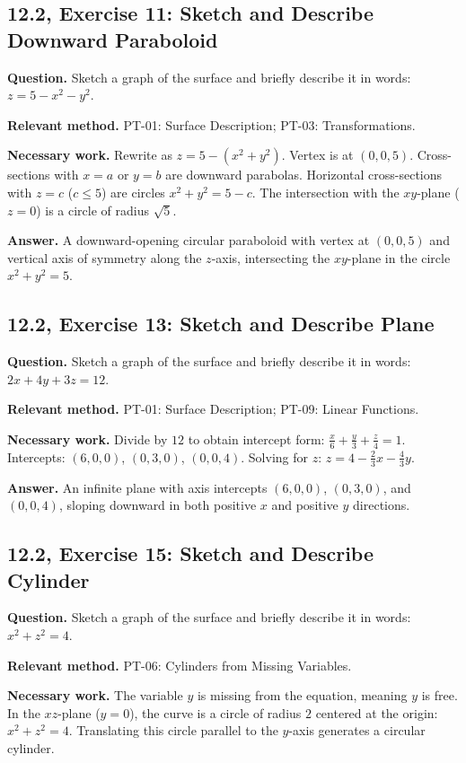 \documentclass[11pt,letterpaper]{article}
\begin{document}
\subsection{12.2, Exercise 11: Sketch and Describe Downward Paraboloid}
\textbf{Question.} Sketch a graph of the surface and briefly describe it in words: $z = 5 - x^2 - y^2$.

\textbf{Relevant method.} PT-01: Surface Description; PT-03: Transformations.

\textbf{Necessary work.}
Rewrite as $z = 5 - (x^2+y^2)$. Vertex is at $(0,0,5)$. Cross-sections with $x=a$ or $y=b$ are downward parabolas. Horizontal cross-sections with $z=c$ ($c \le 5$) are circles $x^2+y^2 = 5-c$. The intersection with the $xy$-plane ($z=0$) is a circle of radius $\sqrt{5}$.

\textbf{Answer.}
A downward-opening circular paraboloid with vertex at $(0,0,5)$ and vertical axis of symmetry along the $z$-axis, intersecting the $xy$-plane in the circle $x^2+y^2=5$.

\subsection{12.2, Exercise 13: Sketch and Describe Plane}
\textbf{Question.} Sketch a graph of the surface and briefly describe it in words: $2x + 4y + 3z = 12$.

\textbf{Relevant method.} PT-01: Surface Description; PT-09: Linear Functions.

\textbf{Necessary work.}
Divide by $12$ to obtain intercept form: $\frac{x}{6} + \frac{y}{3} + \frac{z}{4} = 1$.
Intercepts: $(6,0,0)$, $(0,3,0)$, $(0,0,4)$.
Solving for $z$: $z = 4 - \frac{2}{3}x - \frac{4}{3}y$.

\textbf{Answer.}
An infinite plane with axis intercepts $(6,0,0)$, $(0,3,0)$, and $(0,0,4)$, sloping downward in both positive $x$ and positive $y$ directions.

\subsection{12.2, Exercise 15: Sketch and Describe Cylinder}
\textbf{Question.} Sketch a graph of the surface and briefly describe it in words: $x^2 + z^2 = 4$.

\textbf{Relevant method.} PT-06: Cylinders from Missing Variables.

\textbf{Necessary work.}
The variable $y$ is missing from the equation, meaning $y$ is free. In the $xz$-plane ($y=0$), the curve is a circle of radius $2$ centered at the origin: $x^2+z^2=4$. Translating this circle parallel to the $y$-axis generates a circular cylinder.
\end{document}
